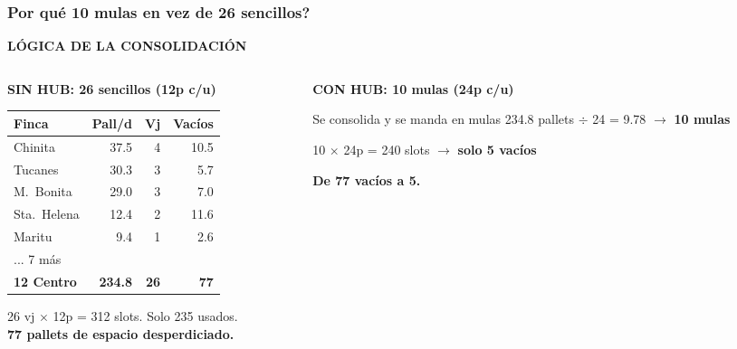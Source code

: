 \documentclass[aspectratio=169, 10pt]{beamer}
\newcommand{\tagline}[2]{{\scriptsize\color{#1}\textbf{\MakeUppercase{#2}}}}
\begin{document}
\begin{frame}
\frametitle{\textquestiondown Por qu\'e 10 mulas en vez de 26 sencillos?}
\tagline{verde}{L\'ogica de la Consolidaci\'on}
\vspace{-2pt}

\begin{columns}[T]
\begin{column}{0.48\textwidth}
{\scriptsize\color{rojo}\textbf{SIN HUB: 26 sencillos (12p c/u)}}
\vspace{1pt}

\scriptsize
\renewcommand{\arraystretch}{0.8}
\begin{tabular}{l r r r}
    \toprule
    \textbf{Finca} & \textbf{Pall/d} & \textbf{Vj} & \textbf{Vac\'ios} \\
    \midrule
    Chinita       & 37.5 & 4 & 10.5 \\
    Tucanes       & 30.3 & 3 & 5.7 \\
    M.\ Bonita    & 29.0 & 3 & 7.0 \\
    Sta.\ Helena  & 12.4 & 2 & \textcolor{rojo}{11.6} \\
    Maritu        &  9.4 & 1 & 2.6 \\
    {\color{gris}\tiny ... 7 m\'as} & & & \\
    \midrule
    \textbf{12 Centro} & \textbf{234.8} & \textcolor{rojo}{\textbf{26}} & \textcolor{rojo}{\textbf{77}} \\
    \bottomrule
\end{tabular}

\vspace{2pt}
{\tiny 26 vj $\times$ 12p = 312 slots. Solo 235 usados.\\
\textcolor{rojo}{\textbf{77 pallets de espacio desperdiciado.}}}
\end{column}

\begin{column}{0.48\textwidth}
{\scriptsize\color{verde}\textbf{CON HUB: 10 mulas (24p c/u)}}
\vspace{1pt}

\begin{block}{\scriptsize Se consolida y se manda en mulas}
\scriptsize
234.8 pallets $\div$ 24 = 9.78 $\rightarrow$ \textbf{10 mulas}

10 $\times$ 24p = 240 slots $\rightarrow$ \textbf{solo 5 vac\'ios}

\vspace{2pt}
\textcolor{verde}{\textbf{De 77 vac\'ios a 5.}}


\end{block}
\end{column}
\end{columns}
\end{frame}
\end{document}
